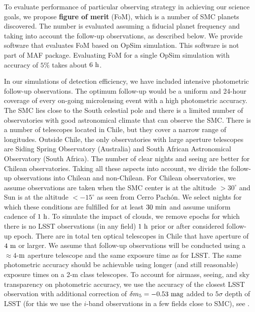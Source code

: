 \documentclass[12pt,letterpaper]{article}
\begin{document}

To evaluate performance of particular observing strategy 
in achieving our science goals, we propose {\bf figure of merit} (FoM), 
which is a number of SMC planets discovered.  The number is evaluated 
assuming a fiducial planet frequency and taking into account the follow-up
observations, as described below.  We provide software that evaluates 
FoM based on OpSim simulation.  This software is not part of MAF package.  
Evaluating FoM for a single OpSim simulation with accuracy of $5\%$ 
takes about $6~{\rm h}$.  

In our simulations of detection efficiency, 
we have included intensive photometric follow-up observations.  
The optimum follow-up would be a uniform and 24-hour coverage of 
every on-going microlensing event with a high photometric accuracy. 
The SMC lies close to the South celestial pole and there is a limited number of 
observatories with good astronomical climate that can observe the SMC.  
There is a number of telescopes located in Chile, but they cover a narrow 
range of longitudes.  Outside Chile, the only observatories with large aperture telescopes are 
Siding Spring Observatory (Australia) and 
South African Astronomical Observatory (South Africa).  
The number of clear nights and seeing are better for Chilean observatories.  
Taking all these aspects into account, we divide the follow-up observations 
into Chilean and non-Chilean.  
For Chilean observatories, we assume observations are taken when the SMC center 
is at the altitude $>30^{\circ}$ and Sun is at the altitude $<-15^{\circ}$ 
as seen from Cerro Pach\'{o}n.  We select nights for which these conditions 
are fulfilled for at least $30~{\rm min}$ and assume uniform cadence of 
$1~{\rm h}$.  To simulate the impact of clouds, we remove epochs for which 
there is no LSST observations (in any field) $1~{\rm h}$ prior or after 
considered follow-up epoch.  There are in total ten optical telescopes 
in Chile that have aperture of $4~{\rm m}$ or larger.  
We assume that follow-up observations will be conducted 
using a $\approx4$-${\rm m}$ aperture telescope and the same exposure time as for LSST.  
The same photometric accuracy should be achievable using longer (and still reasonable) 
exposure times on a 2-m class telescopes.  To account for airmass, seeing, and 
sky transparency on photometric accuracy, we use the accuracy of the closest 
LSST observation with additional correction of $\delta m_5 = -0.53~{\rm mag}$ 
added to $5\sigma$ depth of LSST (for this we use the $i$-band observations 
in a few fields close to SMC), see \citet{ivezic18}. 
\end{document}
